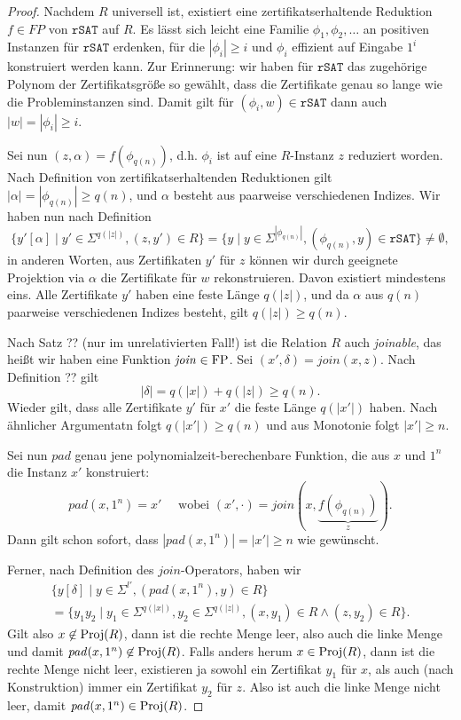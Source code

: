 \begin{proof}
    Nachdem $R$ universell ist, existiert eine zertifikatserhaltende Reduktion $f\in FP$ von $\mathtt{rSAT}$ auf $R$. 
    Es lässt sich leicht eine Familie $\phi_1, \phi_2, \ldots$ an positiven Instanzen für $\mathtt{rSAT}$ erdenken, für die $|\phi_i|\geq i$ und $\phi_i$ effizient auf Eingabe $1^i$ konstruiert werden kann.
    Zur Erinnerung: wir haben für $\mathtt{rSAT}$ das zugehörige Polynom der Zertifikatsgröße so gewählt, dass die Zertifikate genau so lange wie die Probleminstanzen sind. Damit gilt
    für $(\phi_i, w)\in \mathtt{rSAT}$ dann auch $|w|=|\phi_i|\geq i$.

    Sei nun $(z,\alpha)=f(\phi_{q(n)})$, d.h. $\phi_i$ ist auf eine $R$-Instanz $z$ reduziert worden. Nach Definition von zertifikatserhaltenden Reduktionen gilt $|\alpha|=|\phi_{q(n)}|\geq {q(n)}$, und $\alpha$ besteht aus paarweise verschiedenen Indizes. Wir haben nun nach Definition
    \[ \{ y'[\alpha] \mid y'\in \Sigma^{q(|z|)}, (z,y')\in R \} = \{ y\mid y\in \Sigma^{|\phi_{q(n)}|}, (\phi_{q(n)},y)\in\mathtt{rSAT}\} \neq \emptyset, \]
    in anderen Worten, aus Zertifikaten $y'$ für $z$ können wir durch geeignete Projektion via $\alpha$ die Zertifikate für $w$ rekonstruieren. Davon existiert mindestens eins.
    Alle Zertifikate $y'$ haben eine feste Länge $q(|z|)$, und da $\alpha$ aus $q(n)$ paarweise verschiedenen Indizes besteht, 
    gilt $q(|z|) \geq q(n)$. %

    Nach Satz ?? (nur im unrelativierten Fall!) ist die Relation $R$ auch \emph{joinable}, das heißt wir haben eine Funktion $\mathit{join}\in\mathrm{FP}$. Sei $(x',\delta)=\mathit{join}(x, z)$. Nach Definition ?? gilt
    \[ |\delta|=q(|x|)+q(|z|)\geq q(n). \]
    Wieder gilt, dass alle Zertifikate $y'$ für $x'$ die feste Länge $q(|x'|)$ haben. Nach ähnlicher Argumentatn folgt $q(|x'|)\geq q(n)$ und aus Monotonie folgt $|x'|\geq n$.

    Sei nun $\mathit{pad}$ genau jene polynomialzeit-berechenbare Funktion, die aus $x$ und $1^n$ die Instanz $x'$ konstruiert:
    \[ \mathit{pad}(x, 1^n) = x' \quad\text{ wobei } (x', \cdot) = \mathit{join}(x, \underbrace{f(\phi_{q(n)})}_{z}). \]
    Dann gilt schon sofort, dass $|\mathit{pad}(x, 1^n)|=|x'|\geq n$ wie gewünscht.

    Ferner, nach Definition des $\mathit{join}$-Operators, haben wir
    \begin{multline*} \{ y[\delta] \mid y\in\Sigma^{l'}, (\mathit{pad}(x, 1^n), y)\in R \}\\ =  \{ y_1y_2 \mid y_1\in\Sigma^{q(|x|)}, y_2\in\Sigma^{q(|z|)}, (x, y_1)\in R \land (z, y_2)\in R\}.\end{multline*}
    Gilt also $x\not\in\operatorname{Proj}(R)$, dann ist die rechte Menge leer, also auch die linke Menge und damit $\mathit{pad}(x, 1^n)\not\in \operatorname{Proj}(R)$.
    Falls anders herum $x\in\operatorname{Proj}(R)$, dann ist die rechte Menge nicht leer, existieren ja sowohl ein Zertifikat $y_1$ für $x$, als auch (nach Konstruktion) immer ein Zertifikat $y_2$ für $z$. Also ist auch die linke Menge nicht leer, damit $\mathit{pad}(x, 1^n)\in \operatorname{Proj}(R)$.


\end{proof}
